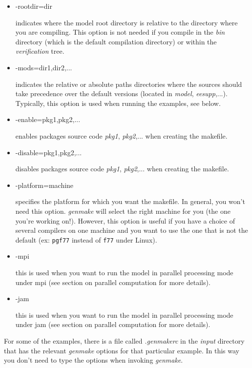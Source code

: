 \begin{itemize}
\item -rootdir=dir

indicates where the model root directory is relative to the directory where
you are compiling. This option is not needed if you compile in the \textit{%
bin} directory (which is the default compilation directory) or within the 
\textit{verification} tree.

\item -mods=dir1,dir2,...

indicates the relative or absolute paths directories where the sources
should take precedence over the default versions (located in \textit{model}, 
\textit{eesupp},...). Typically, this option is used when running the
examples, see below.

\item -enable=pkg1,pkg2,...

enables packages source code \textit{pkg1}, \textit{pkg2},... when creating
the makefile.

\item -disable=pkg1,pkg2,...

disables packages source code \textit{pkg1}, \textit{pkg2},... when creating
the makefile.

\item -platform=machine

specifies the platform for which you want the makefile. In general, you
won't need this option. \textit{genmake} will select the right machine for
you (the one you're working on!). However, this option is useful if you have
a choice of several compilers on one machine and you want to use the one
that is not the default (ex: \texttt{pgf77} instead of \texttt{f77} under
Linux).

\item -mpi

this is used when you want to run the model in parallel processing mode
under mpi (see section on parallel computation for more details).

\item -jam

this is used when you want to run the model in parallel processing mode
under jam (see section on parallel computation for more details).
\end{itemize}

For some of the examples, there is a file called \textit{.genmakerc} in the 
\textit{input} directory that has the relevant \textit{genmake} options for
that particular example. In this way you don't need to type the options when
invoking \textit{genmake}.


